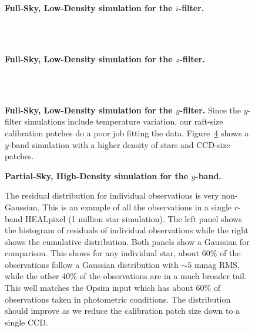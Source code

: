 \documentclass[12pt,preprint]{aastex}
\begin{document}
\begin{figure}
 \\
 \\
\caption{ {\bf Full-Sky, Low-Density simulation for the $i$-filter.}  \label{fig:i1e6}}
\end{figure}

\begin{figure}
 \\
 \\
\caption{ {\bf Full-Sky, Low-Density simulation for the $z$-filter.}  \label{fig:z1e6}}
\end{figure}

\begin{figure}
 \\
 \\
\caption{ {\bf Full-Sky, Low-Density simulation for the $y$-filter.}  Since the $y$-filter simulations include temperature variation, our raft-size calibration patches do a poor job fitting the data.  Figure~\ref{fig:y_fd} shows a $y$-band simulation with a higher density of stars and CCD-size patches.  \label{fig:y1e6}}
\end{figure}

\begin{figure}
\caption{{\bf Partial-Sky, High-Density simulation for the $y$-band.}  \label{fig:y_fd}}
\end{figure}



\begin{figure}
\caption{The residual distribution for individual observations is very non-Gaussian.  This is an example of all the observations in a single $r$-band HEALpixel (1 million star simulation).  The left panel shows the histogram of residuals of individual observations while the right shows the cumulative distribution.  Both panels show a Gaussian for comparison.  This shows for any individual star, about 60\% of the observations follow a Gaussian distribution with $\sim5$ mmag RMS, while the other 40\% of the observations are in a much broader tail.  This well matches the Opsim input which has about 60\% of observations taken in photometric conditions.  The distribution should improve as we reduce the calibration patch size down to a single CCD.  \label{fig:resid_dist}}
\end{figure}
\end{document}
